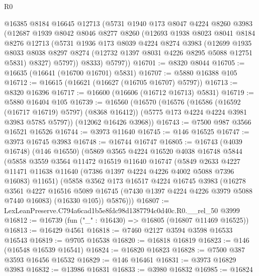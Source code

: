\begin{lexlean}{R0}
\begin{coremodule}
      @16385
      @8184
      @16645
      @12713
      (@5731
        @1940
        @173
        @8047
        @4224
        @8260
        @3983
        (@12687
          @1939
          @8042
          @8046
          @8277
          @8260
          (@12693
            @1938
            @8023
            @8041
            @8184
            @8276
            @12713
            (@5731
              @1936
              @173
              @8039
              @4224
              @8274
              @3983
              (@12699
                @1935
                @8033
                @8038
                @8297
                @8274
                (@12732 @1397 @8031 @4226 @8295 @5088 @12751 @5831)
                @8327)
              @5797))
          @8333)
        @5797))
@16701 := @8320 @8044
@16705 := @16635 (@16641 (@16700 @16701) @5831)
@16707 := @5880 @16388 @105
@16712 := @16615 (@16621 (@16627 (@16705 @16707) @5797))
@16713 := @8320 @16396
@16717 := @16600 (@16606 (@16712 @16713) @5831)
@16719 := @5880 @16404 @105
@16739 := @16560
    (@16570
      (@16576
        (@16586 (@16592 (@16717 @16719) @5797) (@8368 @16412))
        (@5775 @173 @4224 @4224 @3981 @3983 @5785 @5797))
      (@12062 @16426 @3968))
@16743 := @7500 @987 @3566 @16521 @16526
@16744 := @3973 @11640
@16745 := @146 @16525
@16747 := @3973 @16745 @3983
@16748 := @16744 @16747
@16805 := @16743
    (@4039 @16748)
    (@146 @16550)
    (@5869
      @3565
      @4224
      @16520
      @4038
      @16748
      @5844
      (@5858
        @3559
        @3564
        @11472
        @16519
        @11640
        @16747
        (@5849
          @2633
          @4227
          @11471
          @11638
          @11640
          (@7386 @1397 @4224 @4226 @4002 @5088 @7396 @16083)
          @11651)
        (@5858
          @3562
          @173
          @16517
          @4224
          @16745
          @3983
          (@16278
            @3561
            @4227
            @16516
            @5089
            @16745
            (@7430 @1397 @4224 @4226 @3979 @5088 @7440 @16083)
            (@16330 @105))
          @5876)))
@16807 := LexLeanPreserve.C794a6cad1b5e8fdc98d1387794c0d40c.R0.__rel_50 @3999
@16812 := @16739 (fun ("_" : @16430) => @16805 (@16807 @11469 @16525))
@16813 := @16429 @4561
@16818 := @7460 @2127 @3594 @3598 @16533 @16543
@16819 := @9705 @16538
@16820 := @16818 @16819
@16823 := @146 (@16548 @16539 @16541)
@16824 := @16820 @16823
@16828 := @7500 @387 @3593 @16456 @16532
@16829 := @146 @16461
@16831 := @3973 @16829 @3983
@16832 := @13986 @16831
@16833 := @3980 @16832
@16985 := @16824

\end{coremodule}
\end{lexlean}
